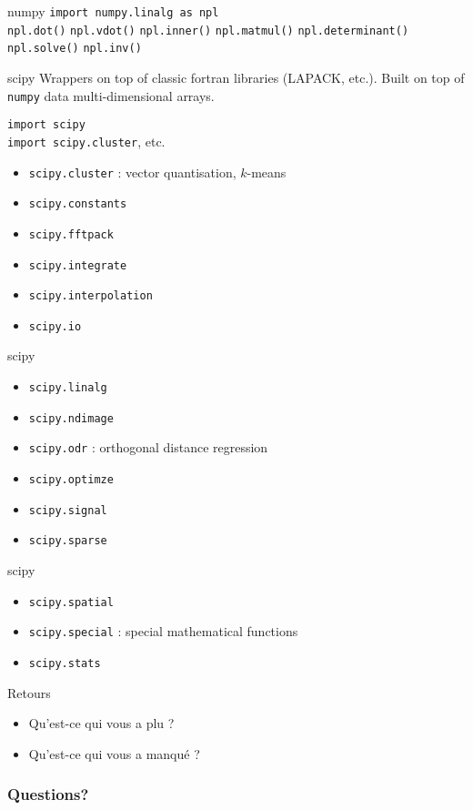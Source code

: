 \begin{frame}{numpy}
  \texttt{import numpy.linalg as npl}\\[2mm]
  \texttt{npl.dot()}
  \texttt{npl.vdot()}
  \texttt{npl.inner()}
  \texttt{npl.matmul()}
  \texttt{npl.determinant()}
  \texttt{npl.solve()}
  \texttt{npl.inv()}
\end{frame}

\begin{frame}{scipy}
  Wrappers on top of classic fortran libraries (LAPACK, etc.).  Built
  on top of \texttt{numpy} data multi-dimensional arrays.
  
  \texttt{import scipy}\\
  \texttt{import scipy.cluster}, etc.

  \begin{itemize}
  \item \texttt{scipy.cluster} : vector quantisation, $k$-means
  \item \texttt{scipy.constants}
  \item \texttt{scipy.fftpack}
  \item \texttt{scipy.integrate}
  \item \texttt{scipy.interpolation}
  \item \texttt{scipy.io}
  \end{itemize}
\end{frame}

\begin{frame}{scipy}
  \begin{itemize}
  \item \texttt{scipy.linalg}
  \item \texttt{scipy.ndimage}
  \item \texttt{scipy.odr} : orthogonal distance regression
  \item \texttt{scipy.optimze}
  \item \texttt{scipy.signal}
  \item \texttt{scipy.sparse}
  \end{itemize}
\end{frame}

\begin{frame}{scipy}
  \begin{itemize}
  \item \texttt{scipy.spatial}
  \item \texttt{scipy.special} : special mathematical functions
  \item \texttt{scipy.stats}
  \end{itemize}
\end{frame}

\begin{frame}{Retours}
  \begin{itemize}
  \item Qu'est-ce qui vous a plu ?
  \item Qu'est-ce qui vous a manqué ?
  \end{itemize}
\end{frame}



\begin{frame}
  \frametitle{Questions?}
\end{frame}


